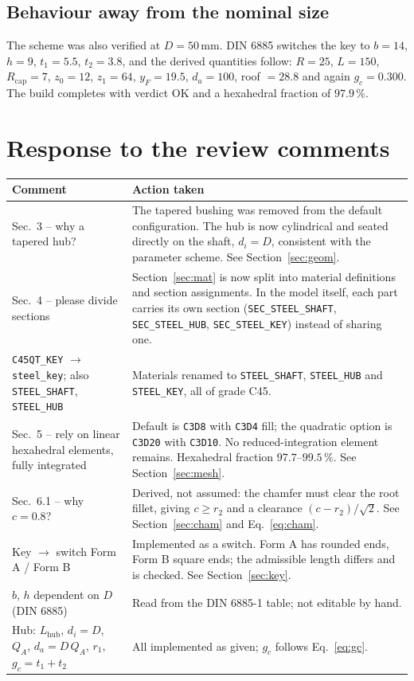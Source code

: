 \documentclass[11pt,a4paper]{article}
\newcommand{\id}[1]{\texttt{#1}}
\newcommand{\unit}[1]{\,\mathrm{#1}}
\begin{document}
\subsection{Behaviour away from the nominal size}
The scheme was also verified at $D = 50\unit{mm}$. DIN 6885 switches the key to
$b = 14$, $h = 9$, $t_1 = 5.5$, $t_2 = 3.8$, and the derived quantities follow:
$R = 25$, $L = 150$, $R_{\text{cap}} = 7$, $z_0 = 12$, $z_1 = 64$,
$y_F = 19.5$, $d_a = 100$, roof $= 28.8$ and again $g_c = 0.300$. The build
completes with verdict OK and a hexahedral fraction of $97.9\,\%$.

\section{Response to the review comments}
\label{sec:review}
\begin{center}
\begin{tabular}{p{}p{}}
\toprule
\textbf{Comment} & \textbf{Action taken} \\
\midrule
Sec.~3 -- why a tapered hub? &
The tapered bushing was removed from the default configuration. The hub is now
cylindrical and seated directly on the shaft, $d_i = D$, consistent with the
parameter scheme. See Section~\ref{sec:geom}. \\
\addlinespace
Sec.~4 -- please divide sections &
Section~\ref{sec:mat} is now split into material definitions and section
assignments. In the model itself, each part carries its own section
(\id{SEC\_STEEL\_SHAFT}, \id{SEC\_STEEL\_HUB}, \id{SEC\_STEEL\_KEY}) instead of
sharing one. \\
\addlinespace
\id{C45QT\_KEY} $\rightarrow$ \id{steel\_key}; also \id{STEEL\_SHAFT},
\id{STEEL\_HUB} &
Materials renamed to \id{STEEL\_SHAFT}, \id{STEEL\_HUB} and \id{STEEL\_KEY},
all of grade C45. \\
\addlinespace
Sec.~5 -- rely on linear hexahedral elements, fully integrated &
Default is \id{C3D8} with \id{C3D4} fill; the quadratic option is \id{C3D20}
with \id{C3D10}. No reduced-integration element remains. Hexahedral fraction
$97.7$--$99.5\,\%$. See Section~\ref{sec:mesh}. \\
\addlinespace
Sec.~6.1 -- why $c = 0.8$? &
Derived, not assumed: the chamfer must clear the root fillet, giving
$c \ge r_2$ and a clearance $(c-r_2)/\sqrt{2}$. See
Section~\ref{sec:cham} and Eq.~\eqref{eq:cham}. \\
\addlinespace
Key $\rightarrow$ switch Form A / Form B &
Implemented as a switch. Form A has rounded ends, Form B square ends; the
admissible length differs and is checked. See Section~\ref{sec:key}. \\
\addlinespace
$b$, $h$ dependent on $D$ (DIN 6885) &
Read from the DIN 6885-1 table; not editable by hand. \\
\addlinespace
Hub: $L_{\text{hub}}$, $d_i = D$, $Q_A$, $d_a = D\,Q_A$, $r_1$,
$g_c = t_1 + t_2$ &
All implemented as given; $g_c$ follows Eq.~\eqref{eq:gc}. \\
\bottomrule
\end{tabular}
\end{center}
\end{document}
